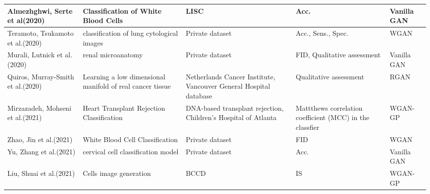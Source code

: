 \documentclass[preprint,12pt,authoryear]{elsarticle}
\begin{document}
{\begin{longtable}{|p{2cm}|p{3cm}|p{2cm}|p{2cm}|p{2cm}|}
Almezhghwi, Serte et al(2020)\cite{apl24}     & Classification of White Blood Cells                       & LISC                                                              & Acc.                                                     & Vanilla GAN                               \\ \hline
Teramoto, Tsukamoto et al.(2020)\cite{apl25}  & classification of lung cytological images                 & Private dataset                                                   & Acc., Sens., Spec.                                       & WGAN                                      \\ \hline
Murali, Lutnick et al.(2020)\cite{apl26}      & renal microanatomy                                        & Private dataset                                                   & FID, Qualitative assessment                              & Vanilla GAN                               \\ \hline
Quiros, Murray-Smith et al.(2020)\cite{apl27} & Learning a low dimensional manifold of real cancer tissue & Netherlands Cancer Institute, Vancouver General Hospital database & Qualitative assessment                                   & RGAN                                      \\ \hline
Mirzazadeh, Mohseni et al.(2021)\cite{apl28}  & Heart Transplant Rejection Classification                 & DNA-based transplant rejection, Children’s Hospital of Atlanta    & Mattthews correlation coefficient (MCC) in the classfier & WGAN-GP                                   \\ \hline
Zhao, Jin et al.(2021)\cite{apl29}            & White Blood Cell Classification                           & Private dataset                                                   & FID                                                      & WGAN                                      \\ \hline
Yu, Zhang et al.(2021)\cite{apl30}            & cervical cell classification model                        & Private dataset                                                   & Acc.                                                     & Vanilla GAN                               \\ \hline
Liu, Shuai et al.(2021)\cite{apl31}           & Cells image generation                                    & BCCD                                                              & IS                                                       & WGAN-GP                                   \\ \hline

\end{longtable}}
\end{document}
